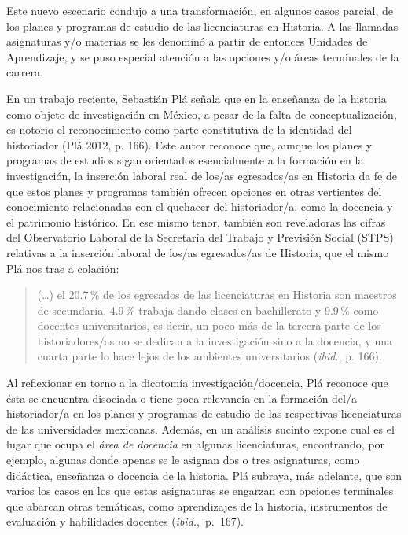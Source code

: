 Este nuevo escenario condujo a una transformación, en algunos casos parcial,
de los planes y programas de estudio de las licenciaturas en Historia. A las llamadas asignaturas y\slash{}o materias se les denominó a partir de entonces
Unidades de Aprendizaje, y se puso especial atención a las opciones y\slash{}o
áreas terminales de la carrera.

\enlargethispage{1\baselineskip}
En un trabajo reciente, Sebastián Plá señala que en la enseñanza de la historia 
como objeto de investigación en México,  a pesar de la falta de
conceptualización,  es notorio el reconocimiento como parte constitutiva de la identidad del
historiador  (Plá 2012, p. 166).  Este autor reconoce que, aunque los planes y programas de estudios sigan orientados esencialmente a la formación en la investigación,  la inserción laboral real de los\slash{}as egresados\slash{}as en Historia da fe de que estos planes y programas también ofrecen opciones en otras vertientes del conocimiento relacionadas con el quehacer del historiador\slash{}a, como la docencia y el patrimonio histórico. En ese mismo tenor, también son reveladoras las cifras del Observatorio Laboral de la Secretaría del Trabajo y Previsión Social (STPS) relativas a la inserción laboral de los\slash{}as egresados\slash{}as de Historia, que el mismo Plá nos trae a colación: 

\begin{quotation}
(\ldots) el 20.7\,\% de los egresados de las licenciaturas en Historia son maestros de secundaria, 4.9\,\% trabaja dando clases en bachillerato y 9.9\,\% como docentes universitarios, es decir, un poco más de la tercera parte de los
historiadores\slash{}as no se dedican a la investigación sino a la docencia, y una
cuarta parte lo hace lejos de los ambientes universitarios (\textit{ibid.}, p.
166).
\end{quotation}

Al reflexionar en torno a la dicotomía investigación\slash{}docencia, Plá reconoce que ésta se encuentra disociada o tiene poca relevancia en la formación del\slash{}a historiador\slash{}a en los planes y programas de estudio de las respectivas licenciaturas de las universidades mexicanas. Además, en un análisis sucinto expone cual es el lugar que ocupa el \textit{área de docencia} en algunas licenciaturas, encontrando, por ejemplo, algunas donde apenas se le asignan dos o tres asignaturas, como didáctica, enseñanza o docencia de la historia. Plá subraya, más adelante, que son varios los casos en los que estas asignaturas se engarzan con opciones terminales que abarcan otras temáticas, 
 como aprendizajes de la historia, instrumentos de evaluación y habilidades docentes (\textit{ibid.},~p.~167).

